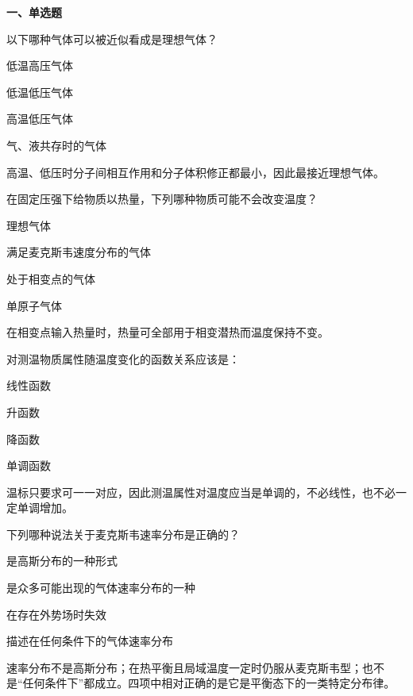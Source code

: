 ﻿

\textbf{一、单选题}
\begin{question}
以下哪种气体可以被近似看成是理想气体？
\begin{choiceoptions}
\item 低温高压气体
\item 低温低压气体
\item 高温低压气体
\item 气、液共存时的气体
\end{choiceoptions}
\begin{solution}
高温、低压时分子间相互作用和分子体积修正都最小，因此最接近理想气体。
\end{solution}
\end{question}

\begin{question}
在固定压强下给物质以热量，下列哪种物质可能不会改变温度？
\begin{choiceoptions}
\item 理想气体
\item 满足麦克斯韦速度分布的气体
\item 处于相变点的气体
\item 单原子气体
\end{choiceoptions}
\begin{solution}
在相变点输入热量时，热量可全部用于相变潜热而温度保持不变。
\end{solution}
\end{question}

\begin{question}
对测温物质属性随温度变化的函数关系应该是：
\begin{choiceoptions}
\item 线性函数
\item 升函数
\item 降函数
\item 单调函数
\end{choiceoptions}
\begin{solution}
温标只要求可一一对应，因此测温属性对温度应当是单调的，不必线性，也不必一定单调增加。
\end{solution}
\end{question}

\begin{question}
下列哪种说法关于麦克斯韦速率分布是正确的？
\begin{choiceoptions}
\item 是高斯分布的一种形式
\item 是众多可能出现的气体速率分布的一种
\item 在存在外势场时失效
\item 描述在任何条件下的气体速率分布
\end{choiceoptions}
\begin{solution}
速率分布不是高斯分布；在热平衡且局域温度一定时仍服从麦克斯韦型；也不是“任何条件下”都成立。四项中相对正确的是它是平衡态下的一类特定分布律。
\end{solution}
\end{question}

